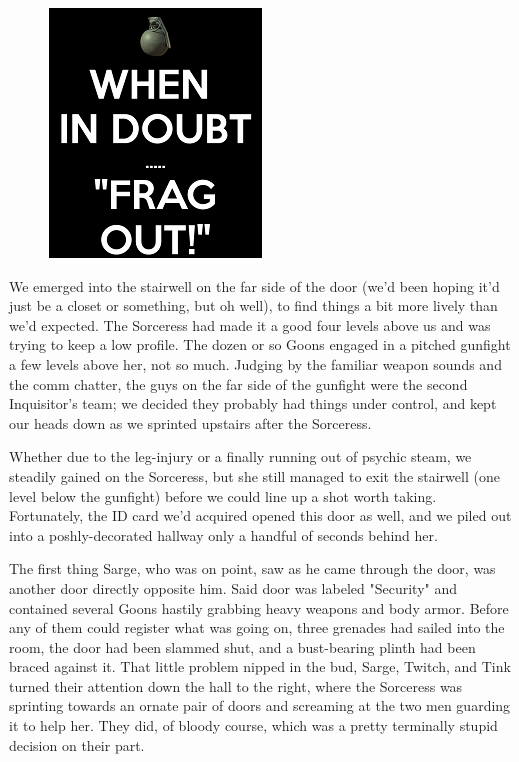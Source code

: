 \begin{figure}
	\begin{center}
		\includegraphics[width=\figwidth]{pics/18/61.png}
	\end{center}
\end{figure}
We emerged into the stairwell on the far side of the door (we'd been hoping it'd just be a closet or something, but oh well), to find things a bit more lively than we'd expected. 
The Sorceress had made it a good four levels above us and was trying to keep a low profile. 
The dozen or so Goons engaged in a pitched gunfight a few levels above her, not so much. 
Judging by the familiar weapon sounds and the comm chatter, the guys on the far side of the gunfight were the second Inquisitor's team; 
we decided they probably had things under control, and kept our heads down as we sprinted upstairs after the Sorceress.

Whether due to the leg-injury or a finally running out of psychic steam, we steadily gained on the Sorceress, but she still managed to exit the stairwell (one level below the gunfight) before we could line up a shot worth taking. 
Fortunately, the ID card we'd acquired opened this door as well, and we piled out into a poshly-decorated hallway only a handful of seconds behind her. 


The first thing Sarge, who was on point, saw as he came through the door, was another door directly opposite him. 
Said door was labeled "Security" and contained several Goons hastily grabbing heavy weapons and body armor. 
Before any of them could register what was going on, three grenades had sailed into the room, the door had been slammed shut, and a bust-bearing plinth had been braced against it. 
That little problem nipped in the bud, Sarge, Twitch, and Tink turned their attention down the hall to the right, where the Sorceress was sprinting towards an ornate pair of doors and screaming at the two men guarding it to help her. 
They did, of bloody course, which was a pretty terminally stupid decision on their part.

